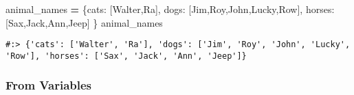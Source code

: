\documentclass[
]{book}
\newenvironment{Shaded}{\begin{snugshade}}{\end{snugshade}}
\newcommand{\NormalTok}[1]{#1}
\newcommand{\OperatorTok}[1]{\textcolor[rgb]{0.43,0.43,0.43}{\textbf{#1}}}
\newcommand{\StringTok}[1]{\textcolor[rgb]{0.5,0.5,0.5}{#1}}
\begin{document}
\begin{Shaded}
\begin{Highlighting}[]
\NormalTok{animal\_names }\OperatorTok{=}\NormalTok{ \{}\StringTok{\textquotesingle{}cats\textquotesingle{}}\NormalTok{:   [}\StringTok{\textquotesingle{}Walter\textquotesingle{}}\NormalTok{,}\StringTok{\textquotesingle{}Ra\textquotesingle{}}\NormalTok{],}
                \StringTok{\textquotesingle{}dogs\textquotesingle{}}\NormalTok{:   [}\StringTok{\textquotesingle{}Jim\textquotesingle{}}\NormalTok{,}\StringTok{\textquotesingle{}Roy\textquotesingle{}}\NormalTok{,}\StringTok{\textquotesingle{}John\textquotesingle{}}\NormalTok{,}\StringTok{\textquotesingle{}Lucky\textquotesingle{}}\NormalTok{,}\StringTok{\textquotesingle{}Row\textquotesingle{}}\NormalTok{],}
                \StringTok{\textquotesingle{}horses\textquotesingle{}}\NormalTok{: [}\StringTok{\textquotesingle{}Sax\textquotesingle{}}\NormalTok{,}\StringTok{\textquotesingle{}Jack\textquotesingle{}}\NormalTok{,}\StringTok{\textquotesingle{}Ann\textquotesingle{}}\NormalTok{,}\StringTok{\textquotesingle{}Jeep\textquotesingle{}}\NormalTok{]}
\NormalTok{               \}}
\NormalTok{animal\_names}
\end{Highlighting}
\end{Shaded}

\begin{verbatim}
#:> {'cats': ['Walter', 'Ra'], 'dogs': ['Jim', 'Roy', 'John', 'Lucky', 'Row'], 'horses': ['Sax', 'Jack', 'Ann', 'Jeep']}
\end{verbatim}

\hypertarget{from-variables}{%
\subsubsection{From Variables}\label{from-variables}}
\end{document}

